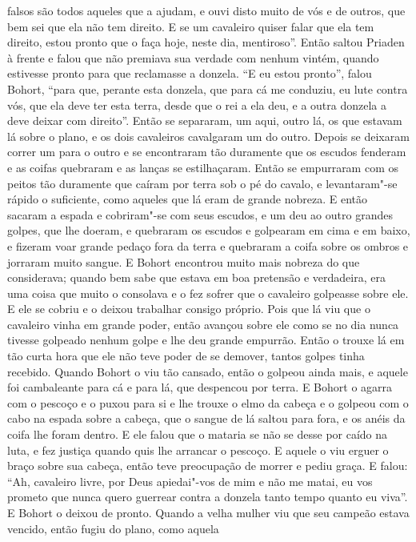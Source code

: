 falsos são todos aqueles que a ajudam, e ouvi disto muito de vós e de outros,
que bem sei que ela não tem direito. E se um cavaleiro quiser falar que ela tem
direito, estou pronto que o faça hoje, neste dia, mentiroso”. Então saltou
Priaden à frente e falou que não premiava sua verdade com nenhum vintém, quando
estivesse pronto para que reclamasse a donzela. “E eu estou pronto”, falou
Bohort, “para que, perante esta donzela, que para cá me conduziu, eu lute
contra vós, que ela deve ter esta terra, desde que o rei a ela deu, e a outra
donzela a deve deixar com direito”. Então se separaram, um aqui, outro lá, os
que estavam lá sobre o plano, e os dois cavaleiros cavalgaram um do outro.
Depois se deixaram correr um para o outro e se encontraram tão duramente que os
escudos fenderam e as coifas quebraram e as lanças se estilhaçaram. Então se
empurraram com os peitos tão duramente que caíram por terra sob o pé do cavalo,
e levantaram"-se rápido o suficiente, como aqueles que lá eram de grande
nobreza. E então sacaram a espada e cobriram"-se com seus escudos, e um deu ao
outro grandes golpes, que lhe doeram, e quebraram os escudos e golpearam em
cima e em baixo, e fizeram voar grande pedaço fora da terra e quebraram a coifa
sobre os ombros e jorraram muito sangue. E Bohort encontrou muito mais nobreza
do que considerava; quando bem sabe que estava em boa pretensão e verdadeira,
era uma coisa que muito o consolava e o fez sofrer que o cavaleiro golpeasse
sobre ele. E ele se cobriu e o deixou trabalhar consigo próprio. Pois que lá
viu que o cavaleiro vinha em grande poder, então avançou sobre ele como se no
dia nunca tivesse golpeado nenhum golpe e lhe deu grande empurrão. Então o
trouxe lá em tão curta hora que ele não teve poder de se demover, tantos golpes
tinha recebido. Quando Bohort o viu tão cansado, então o golpeou ainda mais, e
aquele foi cambaleante para cá e para lá, que despencou por terra. E Bohort o
agarra com o pescoço e o puxou para si e lhe trouxe o elmo da cabeça e o
golpeou com o cabo na espada sobre a cabeça, que o sangue de lá saltou para
fora, e os anéis da coifa lhe foram dentro. E ele falou que o mataria se não se
desse por caído na luta, e fez justiça quando quis lhe arrancar o pescoço. E
aquele o viu erguer o braço sobre sua cabeça, então teve preocupação de morrer
e pediu graça. E falou: “Ah, cavaleiro livre, por Deus apiedai"-vos de mim e não
me matai, eu vos prometo que nunca quero guerrear contra a donzela tanto tempo
quanto eu viva”. E Bohort o deixou de pronto. Quando a velha
mulher viu que seu campeão estava vencido, então fugiu do plano, como aquela
